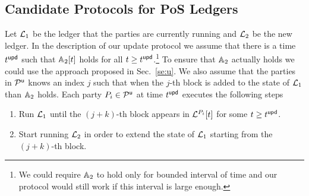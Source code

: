 \subsection{Candidate Protocols for PoS Ledgers}

Let $\mathcal{L}_1$ be the ledger that the parties are currently running and $\mathcal{L}_2$ be the new ledger.
In the description of our update protocol we assume that there is a time $t^{\mathsf{upd}}$ such that $\mathbb{A}_2[t]$ holds for all $t\geq t^{\mathsf{upd}}$.\footnote{We could require $\mathbb{A}_2$ to
hold only for bounded interval of time and our protocol would still work if this interval is large enough.} To ensure that $\mathbb{A}_2$ actually holds we could use
the approach proposed in Sec.~\ref{se:u}. 
We also assume that the parties in $\mathcal{P}^\mathsf{u}$ knows an index $j$ such that when the $j$-th block is added to the state of $\mathcal{L}_1$ than $\mathbb{A}_2$ holds. 
 Each party $P_i\in\mathcal{P}^\mathsf{u}$ at time $t^{\mathsf{upd}}$ executes the following steps

\begin{enumerate}
	\item Run $\mathcal{L}_1$ until the $(j+k)$-th block appears in $\mathcal{L}^{P_i}[t]$ for some $t\geq t^{\mathsf{upd}}$.
	\item Start running $\mathcal{L}_2$ in order to extend the state of $\mathcal{L}_1$ starting from the $(j+k)$-th block.
\end{enumerate}

